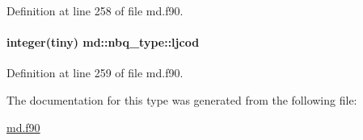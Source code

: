 Definition at line 258 of file md.\-f90.

\hypertarget{structmd_1_1nbq__type_a0415f50907dfda30fdd047736434ad16}{
\paragraph[{ljcod}]{\setlength{\rightskip}{0pt plus 5cm}integer(tiny) md\-::nbq\-\_\-type\-::ljcod}}\label{structmd_1_1nbq__type_a0415f50907dfda30fdd047736434ad16}


Definition at line 259 of file md.\-f90.



The documentation for this type was generated from the following file\-:\begin{DoxyCompactItemize}
\item 
\hyperlink{md_8f90}{md.\-f90}\end{DoxyCompactItemize}
